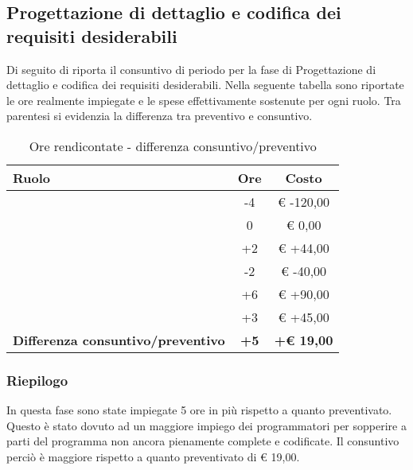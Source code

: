 		\subsection{Progettazione di dettaglio e codifica dei requisiti desiderabili} %
		\label{sub:consuntivo_progettazione_di_dettaglio_e_codifica_dei_requisiti_obbligatori}
			Di seguito di riporta il consuntivo di periodo per la fase di Progettazione di dettaglio e codifica dei requisiti desiderabili. \newline
			Nella seguente tabella sono riportate le ore realmente impiegate e le spese effettivamente sostenute per ogni ruolo. Tra parentesi si evidenzia la differenza tra preventivo e consuntivo.
			\begin{table}[!h]
				\begin{center}
					\begin{tabularx}{0.90\textwidth}{|X|c|c|}
						\hline
						\textbf{Ruolo} & \textbf{Ore} & \textbf{Costo} \\
						\hline
						\roleProjectManager & -4 & \euro{} -120,00 \\
						\hline
						\roleAnalyst & 0 &  \euro{} 0,00 \\
						\hline
						\roleDesigner & +2 & \euro{} +44,00 \\
						\hline
						\roleAdministrator & -2  & \euro{} -40,00 \\
						\hline
						\roleProgrammer & +6 & \euro{} +90,00 \\
						\hline
						\roleVerifier & +3 & \euro{} +45,00 \\
						\hline
						\textbf{Differenza consuntivo/preventivo} & \textbf{+5} & \textbf{+\euro{} 19,00} \\
						\hline
					\end{tabularx}
				\end{center}
			\caption{Ore rendicontate - differenza consuntivo/preventivo}
			\end{table}

			\subsubsection{Riepilogo} %
			In questa fase sono state impiegate 5 ore in più rispetto a quanto preventivato. \newline
			Questo è stato dovuto ad un maggiore impiego dei programmatori per sopperire a parti del programma non ancora pienamente complete e codificate. \newline
			Il consuntivo perciò è maggiore rispetto a quanto preventivato di \euro{} 19,00.

